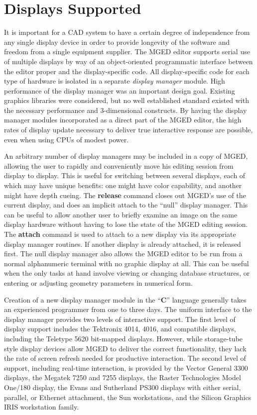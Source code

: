 \section{Displays Supported}

It is important for a CAD system to have a certain degree of independence
from any single display device in order to provide longevity of the
software and freedom from a single equipment supplier.
The MGED editor supports serial use of multiple displays by way of
an object-oriented programmatic
interface between the editor proper and the display-specific code.
All display-specific code for each type of hardware is isolated
in a separate {\em display manager} module.
High performance of the display manager was an important design goal.
Existing graphics libraries
were considered, but no well established standard existed with the necessary
performance and 3-dimensional constructs.
By having the display manager modules incorporated as a direct part of
the MGED editor, the high rates of display update necessary to deliver
true interactive response are possible, even when using CPUs of modest power.

An arbitrary number of
display managers may be included in a copy of MGED, allowing the user
to rapidly and conveniently move his editing session from display to display.
This is useful for switching between several displays, each of
which may have unique benefits:  one might have color capability,
and another might have depth cueing.
The {\bf release} command closes out MGED's use of the current
display, and does an implicit attach to the ``null'' display manager.
This can be useful to allow another user to briefly examine an image
on the same display hardware without having to lose the state of
the MGED editing session.  The {\bf attach} command is used to
attach to a new display via its appropriate display manager routines.
If another display is already attached, it is released first.
The null display manager also allows the MGED editor to be run from a normal
alphanumeric terminal with no graphic display at all.  This can be useful
when the only tasks at hand involve viewing or changing
database structures, or entering or adjusting geometry parameters
in numerical form.

Creation of a new display manager module in the ``{\bf C}'' language
\cite{c-prog-lang}
generally takes an experienced
programmer from one to three days.
The uniform interface to the display manager provides two levels
of interactive support.
The first level of display support includes
the Tektronix 4014, 4016, and compatible displays,
including the Teletype 5620 bit-mapped displays.
However, while storage-tube style display devices allow MGED to
deliver the correct functionality, they lack the
rate of screen refresh needed for productive interaction.
The second level of support, including real-time interaction,
is provided by
the Vector General 3300 displays,
the Megatek 7250 and 7255 displays,
the Raster Technologies Model One/180 display,
the Evans and Sutherland PS300 displays
with either serial, parallel, or Ethernet attachment,
the Sun workstations,
and the Silicon Graphics IRIS workstation family.

